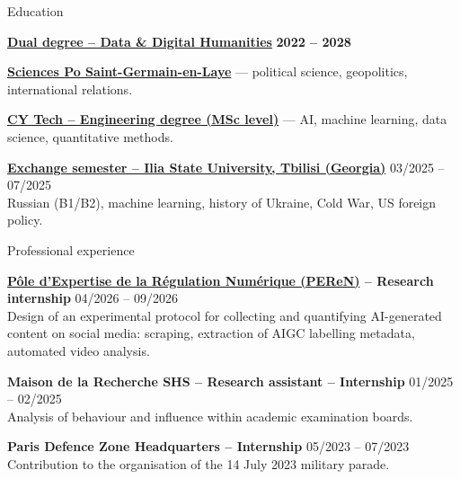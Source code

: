 \documentclass{resume}
\begin{document}

\begin{rSection}{Education}

{\bf \href{https://www.sciencespo-saintgermainenlaye.fr/formations/double-diplome-ingenieur-data-et-humanites-digitales/}{Dual degree -- Data \& Digital Humanities}} \hfill {\bf 2022 -- 2028}

\begin{list}{}{\setlength{\leftmargin}{1.2em}\setlength{\itemsep}{1pt}\setlength{\parskip}{0pt}\setlength{\topsep}{2pt}\setlength{\parsep}{0pt}}
\item {\bf \href{https://www.sciencespo-saintgermainenlaye.fr/}{Sciences Po Saint-Germain-en-Laye}} --- political science, geopolitics, international relations.
\vspace{0.1cm}
\item {\bf \href{https://cytech.cyu.fr/}{CY Tech -- Engineering degree (MSc level)}} --- AI, machine learning, data science, quantitative methods.
\end{list}

\vspace{4pt}
\item {\bf  \href{https://iliauni.edu.ge/en}{Exchange semester -- Ilia State University, Tbilisi (Georgia)}} \hfill {\small 03/2025 -- 07/2025}
\\
{\small Russian (B1/B2), machine learning, history of Ukraine, Cold War, US foreign policy.}

\end{rSection}


\begin{rSection}{Professional experience}

{\bf \href{https://www.peren.gouv.fr/en}{P\^ole d'Expertise de la R\'egulation Num\'erique (PEReN)} -- Research internship} \hfill {\small 04/2026 -- 09/2026}
\\
Design of an experimental protocol for collecting and quantifying AI-generated content on social media: scraping, extraction of AIGC labelling metadata, automated video analysis.

{\bf Maison de la Recherche SHS -- Research assistant -- Internship} \hfill {\small 01/2025 -- 02/2025}
\\
Analysis of behaviour and influence within academic examination boards.

{\bf Paris Defence Zone Headquarters -- Internship} \hfill {\small 05/2023 -- 07/2023}
\\
Contribution to the organisation of the 14 July 2023 military parade.


\end{rSection}
\end{document}
